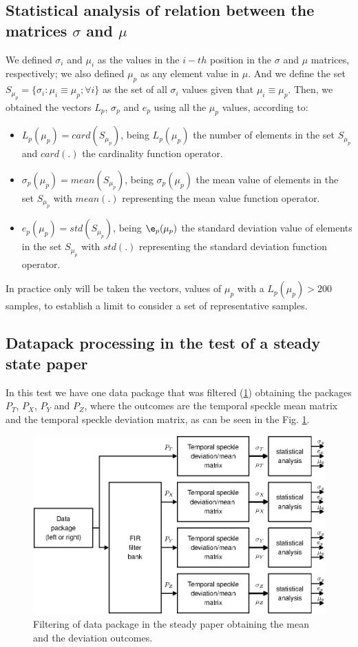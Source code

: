 \documentclass[review]{elsarticle}
\begin{document}
\subsection{Statistical analysis of relation between the matrices $\sigma$ and $\mu$}
\label{subsec:statistical}
We defined $\sigma_i$ and $\mu_i$
as the values in the $i-th$ position in the $\sigma$  
and $\mu$ matrices, respectively; we also defined $\mu_p$
as any element value in  $\mu$.
And we define the set $S_{\mu_p}=\{\sigma_i: \mu_i\equiv \mu_p; \forall i\}$
as the set of all $\sigma_i$  values given that $\mu_i\equiv\mu_p$.
Then, we obtained the vectors $L_p$, $\sigma_p$ and
$e_p$ using all the $\mu_p$ values, according to:
\begin{itemize}
 \item $L_p(\mu_p)=card\left(S_{\mu_p}\right)$,  being $L_p(\mu_p)$ the number of elements
 in the set $S_{\mu_p}$ and $card(.)$ the cardinality function operator.
 \item $\sigma_p(\mu_p)=mean\left(S_{\mu_p}\right)$, being $\sigma_p(\mu_p)$
 the mean value of elements in the set $S_{\mu_p}$ with $mean(.)$ representing the mean value function operator.
 \item $e_p(\mu_p)=std\left(S_{\mu_p}\right)$, being $\e_p(\mu_p)$
 the standard  deviation value of elements in the set $S_{\mu_p}$ with $std(.)$ representing the standard deviation function operator.
\end{itemize}
In practice only will be taken the vectors, values of $\mu_p$
with a $L_p(\mu_p)>200$ samples, to establish a limit to consider a set of representative samples.


\subsection{Datapack processing in the test of a steady state paper}
\label{subsec:numprocink}

In this test we have one data package that was filtered (\ref{fig:filtering2}) obtaining the packages $P_T$, $P_X$, $P_Y$ and $P_Z$, where the outcomes are the temporal speckle mean matrix and the 
temporal speckle deviation matrix, as can be seen in the Fig. \ref{fig:filtering2}.

\begin{figure}[h!]
\centering
\includegraphics[width=0.65\columnwidth]{filtering2.eps}
\caption{Filtering of data package in the steady paper obtaining the mean and the deviation outcomes.}
\label{fig:filtering2}
\end{figure}
\end{document}
